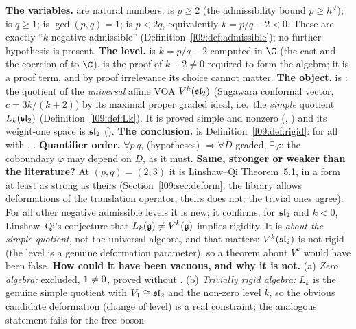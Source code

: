 \begin{dictionary}
\textbf{The variables.}  are natural numbers.  is $p\ge2$ (the
admissibility bound $p\ge h^\vee$);  is $q\ge1$;  is
$\gcd(p,q)=1$;  is $p<2q$, equivalently $k = p/q-2 < 0$. These are exactly
``$k$ negative admissible'' (Definition~\ref{l09:def:admissible}); no further hypothesis is present.
\textbf{The level.}  is $k = p/q-2$ computed in $\C$ (the cast  and the
coercion of  to $\C$).  is the proof of $k+2\ne0$
required to form the algebra; it is a proof term, and by proof irrelevance its choice cannot
matter. \textbf{The object.}  is
: the quotient of the \emph{universal} affine
VOA $V^k(\mathfrak{sl}_2)$ (Sugawara conformal vector, $c = 3k/(k+2)$) by its maximal proper graded ideal,
i.e.\ the \emph{simple} quotient $L_k(\mathfrak{sl}_2)$ (Definition~\ref{l09:def:Lk}). It is proved simple and
nonzero (, ) and its weight-one space is $\mathfrak{sl}_2$
(). \textbf{The conclusion.}  is
Definition~\ref{l09:def:rigid}: for all  with
, . \textbf{Quantifier order.} $\forall p\,q$, (hypotheses)
$\Rightarrow \forall D$ graded, $\exists\varphi$: the coboundary $\varphi$ may depend on $D$, as it must.
\textbf{Same, stronger or weaker than the literature?} At $(p,q) = (2,3)$ it is Linshaw--Qi
Theorem~5.1, in a form at least as strong as theirs (Section~\ref{l09:sec:deform}: the library allows
deformations of the translation operator, theirs does not; the trivial ones agree). For all other
negative admissible levels it is new; it confirms, for $\mathfrak{sl}_2$ and $k<0$, Linshaw--Qi's conjecture
that $L_k(\mathfrak{g})\neq V^k(\mathfrak{g})$ implies rigidity. It is \emph{about the simple quotient}, not the
universal algebra, and that matters: $V^k(\mathfrak{sl}_2)$ is not rigid (the level is a genuine deformation
parameter), so a theorem about $V^k$ would have been false.
\textbf{How could it have been vacuous, and why it is not.} (a) \emph{Zero algebra:} excluded,
$\mathbf{1}\neq0$, proved without . (b) \emph{Trivially rigid algebra:} $L_k$ is the genuine
simple quotient with $V_1\cong\mathfrak{sl}_2$ and the non-zero level $k$, so the obvious candidate deformation
(change of level) is a real constraint; the analogous statement fails for the free boson

\end{dictionary}
